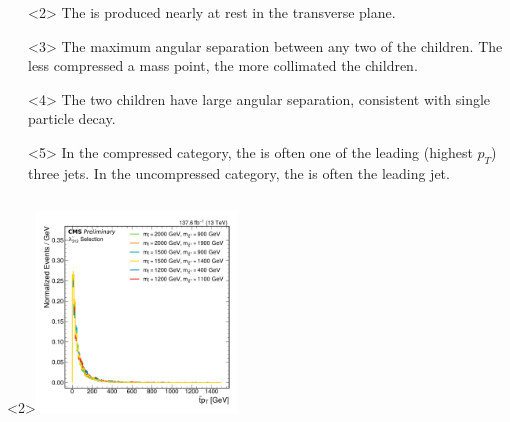 \documentclass[]{beamer}
\begin{document}
\begin{frame}
    \begin{overlayarea}{\textwidth}{2.5cm}
      \begin{columns}
        \begin{column}{0.3\textwidth}
        \end{column}
        \begin{column}{0.7\textwidth}
          \begin{onlyenv}<2> The \stopq{} is produced nearly at rest in the transverse plane. \end{onlyenv}
          \begin{onlyenv}<3> The maximum angular separation between any two of the \chargino{} children. The less compressed a mass point, the more collimated the children. \end{onlyenv}
          \begin{onlyenv}<4> The two \stopq{} children have large angular separation, consistent with single particle decay. \end{onlyenv}
          \begin{onlyenv}<5> In the compressed category, the \chargino{} \quarkb{} is often one of the leading (highest $p_{T}$) three jets. In the uncompressed category, the \stopq{} \quarkb{} is often the leading jet. \end{onlyenv}
        \end{column}
      \end{columns}
    \end{overlayarea}
    \begin{center}
      \begin{onlyenv}<2>\includegraphics[width=0.4\textwidth]{figures/stop_pt.pdf}\end{onlyenv}

\end{center}
\end{frame}
\end{document}

